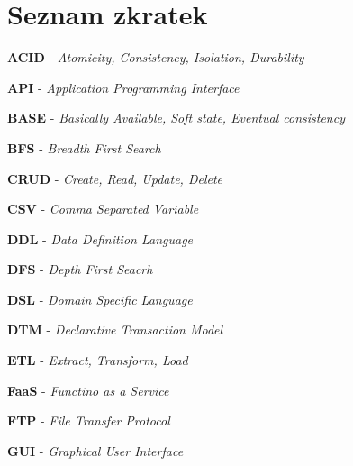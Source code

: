 \documentclass[11pt,twoside,a4paper]{book}
\begin{document}
	\tableofcontents		%

	\listoffigures			%
	\listoftables			%
	\lstlistoflistings         %

	\mainbodystarts











{
\def\CS{$\cal C\kern-0.1667em\lower.5ex\hbox{$\cal S$}\kern-0.075em $}

}

\appendix

\chapter{Seznam zkratek}
\printnomenclature
\label{apx:zkratky}

\textbf{ACID} - \textit{Atomicity, Consistency, Isolation, Durability}

\textbf{API} - \textit{Application Programming Interface}

\textbf{BASE} - \textit{Basically Available, Soft state, Eventual consistency}

\textbf{BFS} - \textit{Breadth First Search}

\textbf{CRUD} - \textit{Create, Read, Update, Delete}

\textbf{CSV} - \textit{Comma Separated Variable}

\textbf{DDL} - \textit{Data Definition Language}

\textbf{DFS} - \textit{Depth First Seacrh}

\textbf{DSL} - \textit{Domain Specific Language}

\textbf{DTM} - \textit{Declarative Transaction Model}

\textbf{ETL} - \textit{Extract, Transform, Load}

\textbf{FaaS} - \textit{Functino as a Service}

\textbf{FTP} - \textit{File Transfer Protocol}

\textbf{GUI} - \textit{Graphical User Interface}
\end{document}
